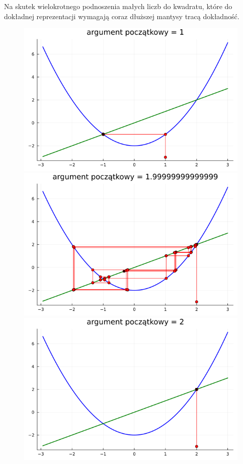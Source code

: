 \documentclass{article}
\begin{document}
Na skutek wielokrotnego podnoszenia małych liczb do kwadratu, które do dokładnej reprezentacji wymagają coraz dłuższej mantysy tracą dokładność. 
\begin{figure}[h!]
    \centering
    \includegraphics[scale=0.39]{plots/x^2-2:1.png}
    \includegraphics[scale=0.39]{plots/x^2-2:1.999.png}
    \includegraphics[scale=0.39]{plots/x^2-2:2.png}

\end{figure}
\end{document}
